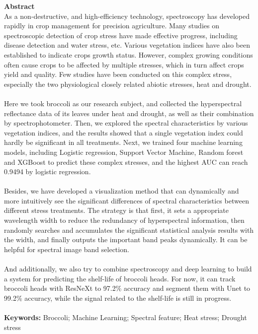 \documentclass[12pt,a4paper]{article}
\begin{document}
\mbox{}\newline\vspace{4mm} \mbox{}\LARGE
%
{\bf Abstract} \normalsize \vspace{1mm}
\\
As a non-destructive, and high-efficiency technology, spectroscopy has developed rapidly in crop management for precision agriculture. Many studies on spectroscopic detection of crop stress have made effective progress, including disease detection and water stress, etc. Various vegetation indices have also been established to indicate crops growth status. However, complex growing conditions often cause crops to be affected by multiple stresses, which in turn affect crops yield and quality. Few studies have been conducted on this complex stress, especially the two physiological closely related abiotic stresses, heat and drought. 
\\
\\
Here we took broccoli as our research subject, and collected the hyperspectral reflectance data of its leaves under heat and drought, as well as their combination by spectrophotometer. Then, we explored the spectral characteristics by various vegetation indices, and the results showed that a single vegetation index could hardly be significant in all treatments. Next, we trained four machine learning models, including Logistic regression, Support Vector Machine, Random forest and XGBoost to predict these complex stresses, and the highest AUC can reach 0.9494 by logistic regression. 
\\
\\
Besides, we have developed a visualization method that can dynamically and more intuitively see the significant differences of spectral characteristics between different stress treatments. The strategy is that first, it sets a appropriate wavelength width to reduce the redundancy of hyperspectral information, then randomly searches and accumulates the significant statistical analysis results with the width, and finally outputs the important band peaks dynamically. It can be helpful for spectral image band selection.
\\
\\
And additionally, we also try to combine spectroscopy and deep learning to build a system for predicting the shelf-life of broccoli heads. For now, it can track broccoli heads with ResNeXt to 97.2\% accuracy and segment them with Unet to 99.2\% accuracy, while the signal related to the shelf-life is still in progress.
\\
\\
\textbf{Keywords:} Broccoli; Machine Learning; Spectral feature; Heat stress; Drought stress
\end{document}
